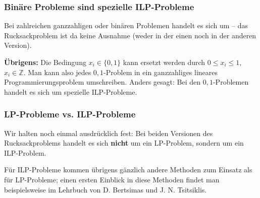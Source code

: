 \documentclass[smaller]{beamer}
\begin{document}
\begin{frame}
 \frametitle{Binäre Probleme sind spezielle ILP-Probleme}
 Bei zahlreichen ganzzahligen oder binären Problemen handelt es sich um  -- das Rucksackproblem ist da keine Ausnahme (weder in der einen noch in der anderen Version). \\ \vspace*{0.2cm}

\textbf{Übrigens:} Die Bedingung $x_i \in \big\{ 0,1 \big\}$ kann ersetzt werden durch $0 \leq x_i \leq 1$, $x_i \in \mathbb{Z}$. Man kann also jedes $0,1$-Problem in ein ganzzahliges lineares Programmierungsproblem umschreiben. Anders gesagt: Bei den $0,1$-Problemen handelt es sich um spezielle ILP-Probleme.
\end{frame}

\begin{frame}
 \frametitle{LP-Probleme vs. ILP-Probleme}
 Wir halten noch einmal ausdrücklich fest: \alert{Bei beiden Versionen des Rucksackproblems handelt es sich \textbf{nicht} um ein LP-Problem, sondern um ein ILP-Problem.} \\ \vspace*{0.2cm}
 
 Für ILP-Probleme kommen übrigens gänzlich andere Methoden zum Einsatz als für LP-Probleme; einen ersten Einblick in diese Methoden findet man beispielsweise im Lehrbuch von D. Bertsimas und J. N. Tsitsiklis. 
\end{frame}
\end{document}

